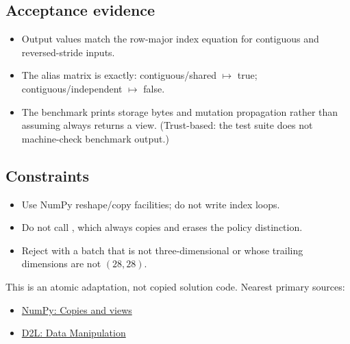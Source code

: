         \subsection{Acceptance evidence}

        \begin{evidencebox}
        \begin{itemize}
          \item Output values match the row-major index equation for contiguous and reversed-stride inputs.
  \item The alias matrix is exactly: contiguous/shared $\mapsto$ true; contiguous/independent $\mapsto$ false.
  \item The benchmark prints storage bytes and mutation propagation rather than assuming  always returns a view. (Trust-based: the test suite does not machine-check benchmark output.)
        \end{itemize}
        \end{evidencebox}

        \subsection{Constraints}

        \begin{itemize}
          \item Use NumPy reshape/copy facilities; do not write index loops.
  \item Do not call , which always copies and erases the policy distinction.
  \item Reject with  a batch that is not three-dimensional or whose trailing dimensions are not $(28,28)$.
        \end{itemize}

        \begin{sourcebox}
        This is an atomic adaptation, not copied solution code. Nearest primary sources:
        \begin{itemize}
          \item \href{https://numpy.org/doc/stable/user/basics.copies.html}{NumPy: Copies and views}
  \item \href{https://d2l.ai/chapter_preliminaries/ndarray.html}{D2L: Data Manipulation}
        \end{itemize}
        \end{sourcebox}
